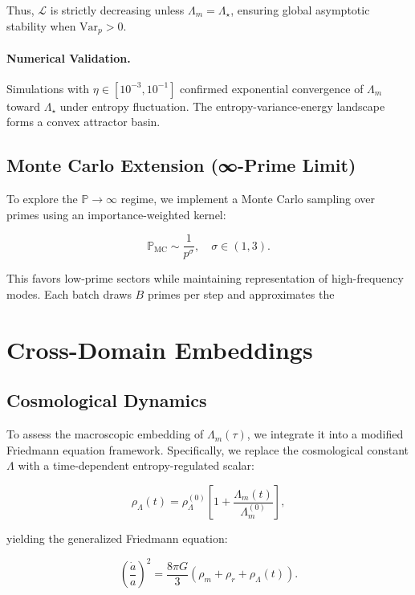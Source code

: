 \documentclass[12pt]{article}
\theoremstyle{plain}
\begin{document}
Thus, $\mathcal{L}$ is strictly decreasing unless $\Lambda_m = \Lambda_\star$, ensuring global asymptotic stability when $\text{Var}_p > 0$.

\paragraph{Numerical Validation.} Simulations with $\eta \in [10^{-3}, 10^{-1}]$ confirmed exponential convergence of $\Lambda_m$ toward $\Lambda_\star$ under entropy fluctuation. The entropy-variance-energy landscape forms a convex attractor basin.

\subsection{Monte Carlo Extension (∞-Prime Limit)}

To explore the $\mathbb{P} \to \infty$ regime, we implement a Monte Carlo sampling over primes using an importance-weighted kernel:

\begin{equation}
\mathbb{P}_{\text{MC}} \sim \frac{1}{p^\sigma}, \quad \sigma \in (1, 3).
\end{equation}

This favors low-prime sectors while maintaining representation of high-frequency modes. Each batch draws $B$ primes per step and approximates the


\section{Cross-Domain Embeddings}

\subsection{Cosmological Dynamics}

To assess the macroscopic embedding of $\Lambda_m(\tau)$, we integrate it into a modified Friedmann equation framework. Specifically, we replace the cosmological constant $\Lambda$ with a time-dependent entropy-regulated scalar:

\begin{equation}
\rho_\Lambda(t) = \rho_{\Lambda}^{(0)} \left[ 1 + \frac{\Lambda_m(t)}{\Lambda_m^{(0)}} \right],
\end{equation}

yielding the generalized Friedmann equation:

\begin{equation}
\left( \frac{\dot{a}}{a} \right)^2 = \frac{8\pi G}{3} \left( \rho_m + \rho_r + \rho_\Lambda(t) \right).
\end{equation}
\end{document}
